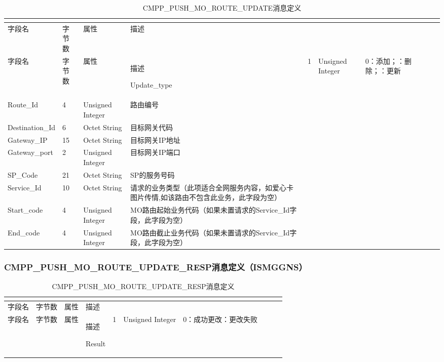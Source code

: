 \documentclass[11pt]{book} %
\begin{document}
\begin{longtable}{|m{90pt}|m{35pt}|m{80pt}|m{200pt}|}
\tabularnewline\hline
字段名&字节数&属性&描述
\endhead

\caption{CMPP\_PUSH\_MO\_ROUTE\_UPDATE消息定义}\\
\hline
字段名&字节数&属性&描述
\endfirsthead

\endfoot

\endlastfoot

\hline
Update\_type&1&Unsigned Integer&0：添加；：删除；：更新\\
\hline
Route\_Id&4&Unsigned Integer&路由编号\\
\hline
Destination\_Id&6&Octet String&目标网关代码\\
\hline
Gateway\_IP&15&Octet String&目标网关IP地址\\
\hline
Gateway\_port&2&Unsigned Integer&目标网关IP端口\\
\hline
SP\_Code&21&Octet String&SP的服务号码\\
\hline
Service\_Id&10&Octet String&请求的业务类型（此项适合全网服务内容，如爱心卡图片传情,如该路由不包含此业务，此字段为空）\\
\hline
Start\_code&4&Unsigned Integer&MO路由起始业务代码（如果未置请求的Service\_Id字段，此字段为空）\\
\hline
End\_code&4&Unsigned Integer&MO路由截止业务代码（如果未置请求的Service\_Id字段，此字段为空）\\
\hline
\end{longtable}



\subsubsection{CMPP\_PUSH\_MO\_ROUTE\_UPDATE\_RESP消息定义（ISMG\textrightarrow GNS）}



\begin{longtable}{|m{90pt}|m{35pt}|m{80pt}|m{200pt}|}
\tabularnewline\hline
字段名&字节数&属性&描述
\endhead

\caption{CMPP\_PUSH\_MO\_ROUTE\_UPDATE\_RESP消息定义}\\
\hline
字段名&字节数&属性&描述
\endfirsthead

\endfoot

\endlastfoot

\hline
Result&1&Unsigned Integer&0：成功更改：更改失败\\
\hline
\end{longtable}
\end{document}
